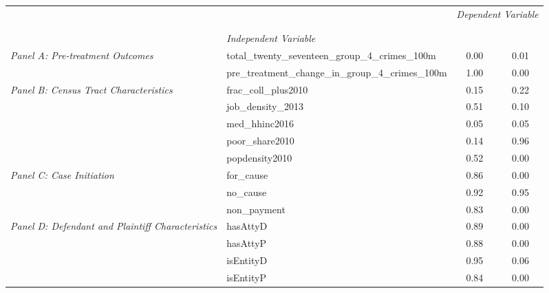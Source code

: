 \begin{tabular}{llcc}
\toprule
 &  & \multicolumn{2}{c}{\textit{Dependent Variable}} \\
\cline{3-4}
\\
 &  &  &  \\
 & \emph{Independent Variable} &  &  \\
\midrule
\multirow[c]{2}{3cm}{\textit{Panel A: Pre-treatment Outcomes}} & total_twenty_seventeen_group_4_crimes_100m & 0.00 & 0.01 \\
 & pre_treatment_change_in_group_4_crimes_100m & 1.00 & 0.00 \\
\cline{1-4}
\multirow[c]{5}{3cm}{\textit{Panel B: Census Tract Characteristics}} & frac_coll_plus2010 & 0.15 & 0.22 \\
 & job_density_2013 & 0.51 & 0.10 \\
 & med_hhinc2016 & 0.05 & 0.05 \\
 & poor_share2010 & 0.14 & 0.96 \\
 & popdensity2010 & 0.52 & 0.00 \\
\cline{1-4}
\multirow[c]{3}{3cm}{\textit{Panel C: Case Initiation}} & for_cause & 0.86 & 0.00 \\
 & no_cause & 0.92 & 0.95 \\
 & non_payment & 0.83 & 0.00 \\
\cline{1-4}
\multirow[c]{4}{3cm}{\textit{Panel D: Defendant and Plaintiff Characteristics}} & hasAttyD & 0.89 & 0.00 \\
 & hasAttyP & 0.88 & 0.00 \\
 & isEntityD & 0.95 & 0.06 \\
 & isEntityP & 0.84 & 0.00 \\
\cline{1-4}
\bottomrule
\end{tabular}
